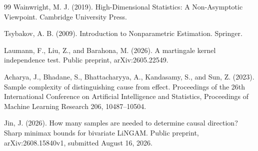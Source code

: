 \documentclass{article}
\begin{document}
\begin{thebibliography}{99}
   Wainwright, M. J. (2019). High-Dimensional Statistics: A Non-Asymptotic Viewpoint. Cambridge University Press.

   Tsybakov, A. B. (2009). Introduction to Nonparametric Estimation. Springer.

   Laumann, F., Liu, Z., and Barahona, M. (2026). A martingale kernel independence test. Public preprint, arXiv:2605.22549.

   Acharya, J., Bhadane, S., Bhattacharyya, A., Kandasamy, S., and Sun, Z. (2023). Sample complexity of distinguishing cause from effect. Proceedings of the 26th International Conference on Artificial Intelligence and Statistics, Proceedings of Machine Learning Research 206, 10487--10504.

   Jin, J. (2026). How many samples are needed to determine causal direction? Sharp minimax bounds for bivariate LiNGAM. Public preprint, arXiv:2608.15840v1, submitted August 16, 2026.

\end{thebibliography}
\end{document}

